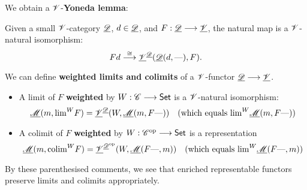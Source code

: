 \documentclass[11pt]{article}
\begin{document}
\begin{itemise}
\begin{itemize}
\end{itemize}
\item We obtain a $\mathscr{V}$-\textbf{Yoneda lemma}:
\begin{lem*}
Given a small $\mathscr{V}$-category 
$\underline{\mathscr{D}}$, $d\in\underline{\mathscr{D}}$, and $F:\underline{\mathscr{D}}\longrightarrow\underline{\mathscr{V}}$, the natural map is a $\mathscr{V}$-natural isomorphism:
\[Fd\overset{\cong}{\longrightarrow}\underline{\mathscr{V}}^{\underline{\mathscr{D}}}(\underline{\mathscr{D}}(d,\textup{---} ),F).\]
\end{lem*}
\item We can define \textbf{weighted limits and colimits} of a $\mathscr{V}$-functor $\underline{\mathscr{D}}\longrightarrow\underline{\mathscr{V}}$.
\begin{itemize}\squishlist
\setlength{\parindent}{.25in}
\item A limit of $F$ \textbf{weighted} by $W:\mathscr{C}\longrightarrow\operatorname{{\mathsf{Set}}}$ is a $\mathscr{V}$-natural isomorphism:
\[\underline{\mathscr{M}}(m,\textstyle\operatorname*{lim}^W\! F)=\underline{\mathscr{V}}^{\underline{\mathscr{D}}}(W,\underline{\mathscr{M}}(m,F\textup{---} ))\quad \textup{(which equals $\operatorname*{lim}^W\!\underline{\mathscr{M}}(m,F\textup{---} )$)}\]
\item A colimit of $F$ \textbf{weighted} by $W:\mathscr{C}^{\textup{op}}\longrightarrow\operatorname{{\mathsf{Set}}}$ is a representation
\[\underline{\mathscr{M}}(m,\textstyle\operatorname*{colim}^W\! F)= \underline{\mathscr{V}}^{ \underline{\mathscr{D}}^{\textup{op}}}(W,\underline{\mathscr{M}}(F\textup{---},m ))\quad \textup{(which equals $\operatorname*{lim}^W\!\underline{\mathscr{M}}(F\textup{---} ,m)$)}\]
\end{itemize}
By these parenthesised comments, we see that enriched representable functors preserve limits and colimits appropriately.
\end{itemise}
\end{document}
